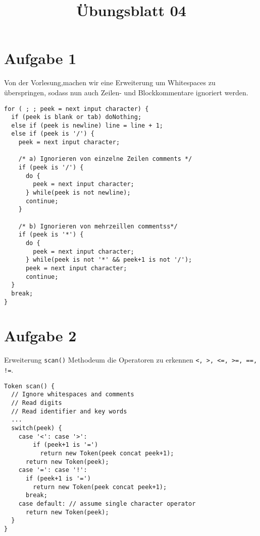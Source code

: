 \documentclass[11pt,a4paper,ngerman]{article}
\title{Übungsblatt 04}
\date{}
\newcommand\parmed{\par\medskip}
\begin{document}
 
%
%
\maketitle
\thispagestyle{fancy}


\section*{Aufgabe 1}
Von der Vorlesung,machen wir eine Erweiterung um Whitespaces zu überspringen, sodass nun auch Zeilen- und Blockkommentare ignoriert werden.
\parmed
\begin{lstlisting}
for ( ; ; peek = next input character) {
  if (peek is blank or tab) doNothing;
  else if (peek is newline) line = line + 1; 
  else if (peek is '/') {
    peek = next input character;
    
    /* a) Ignorieren von einzelne Zeilen comments */
    if (peek is '/') { 
      do {
      	peek = next input character;
      } while(peek is not newline);      
      continue;
    } 
    
    /* b) Ignorieren von mehrzeillen commentss*/
    if (peek is '*') {
      do {
      	peek = next input character;
      } while(peek is not '*' && peek+1 is not '/');
      peek = next input character;
      continue;  
  }
  break;
}
\end{lstlisting}

\section*{Aufgabe 2}
Erweiterung \texttt{scan()} Methodeum die Operatoren zu erkennen \texttt{<, >, <=, >=, ==, !=}.
\parmed
\begin{lstlisting}
Token scan() {
  // Ignore whitespaces and comments
  // Read digits
  // Read identifier and key words
  ...
  switch(peek) {
    case '<': case '>':
    	if (peek+1 is '=')
    	  return new Token(peek concat peek+1);
      return new Token(peek);
    case '=': case '!':
      if (peek+1 is '=')
        return new Token(peek concat peek+1);
      break;
    case default: // assume single character operator  
      return new Token(peek);
  }
}
\end{lstlisting}
\end{document}
